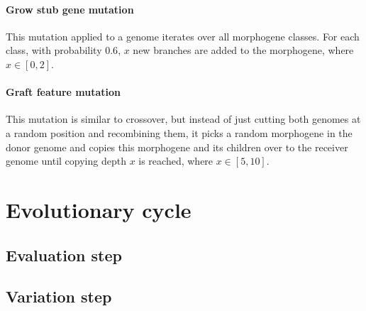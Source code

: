 \documentclass[main]{subfiles}
\begin{document}
\paragraph{Grow stub gene mutation}

This mutation applied to a genome iterates over all morphogene classes. For each class, with probability $0.6$, $x$ new branches are added to the morphogene, where $x \in [0,2]$.

\paragraph{Graft feature mutation}

This mutation is similar to crossover, but instead of just cutting both genomes at a random position and recombining them, it picks a random morphogene in the donor genome and copies this morphogene and its children over to the receiver genome until copying depth $x$ is reached, where $x \in [5,10]$.

\section{Evolutionary cycle}

\lipsum[16]

\subsection{Evaluation step}

\lipsum[17]

\subsection{Variation step}

\lipsum[18]
\end{document}
